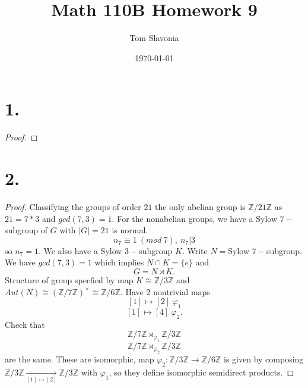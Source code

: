 \documentclass{article}
\title{Math 110B Homework 9}
\author{Tom Slavonia}
\date{\today}
\begin{document}
\maketitle

\section*{1.}
\begin{proof}
    
\end{proof}

\section*{2.}
\begin{proof}
    Classifying the groups of order $21$ the only abelian group is $\mathbb{Z}/21\mathbb{Z}$ as $21 = 7*3$ and $gcd(7,3 ) = 1$. For the nonabelian groups, we have a Sylow $7-$subgroup of $G$ with $|G| = 21$ is normal.
    \[
    n_7 \equiv 1 \ (mod \ 7), \ n_7|3    
    \]
    so $n_7= 1$. We also have a Sylow $3-$subgroup $K$. Write $N = $Sylow $7-$subgroup. We have $gcd(7, 3) = 1$ which implies $N \cap K = \{e\}$ and 
    \[
    G = N\rtimes K.    
    \]
    Structure of group specfied by map $K \cong \mathbb{Z}/3\mathbb{Z}$ and $Aut(N) \cong (\mathbb{Z}/7\mathbb{Z})^{\times} \cong \mathbb{Z}/6\mathbb{Z}$. Have $2$ nontrivial maps
    \[
    [1] \mapsto [2] \ \varphi_1    
    \]
    \[
    [1] \mapsto [4] \ \varphi_2.    
    \]
    Check that \[\mathbb{Z}/7\mathbb{Z} \rtimes_{\varphi_1}\mathbb{Z}/3 \mathbb{Z}\]\[
    \mathbb{Z}/7\mathbb{Z} \rtimes_{\varphi_2}\mathbb{Z}/3\mathbb{Z}    
    \]
    are the same. These are isomorphic, map $\varphi_2: \mathbb{Z}/3\mathbb{Z} \to \mathbb{Z}/6\mathbb{Z}$ is given by composing $\mathbb{Z}/3\mathbb{Z} \xrightarrow[[1]\mapsto [2]]{} \mathbb{Z}/3\mathbb{Z}$ with $\varphi_1$, so they define isomorphic semidirect products. 
\end{proof}
\end{document}
